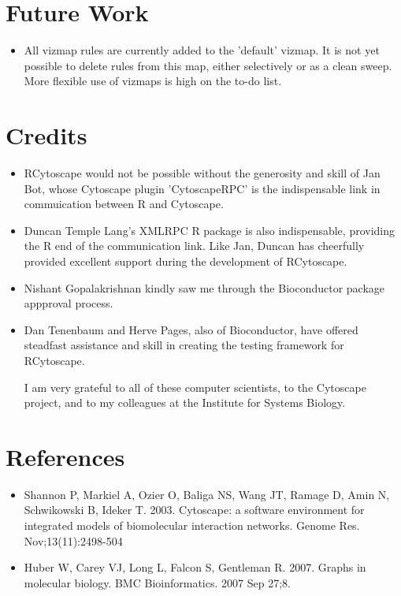 \documentclass[12pt]{article}
\begin{document}
\section{Future Work}

\begin{itemize}

\item All vizmap rules are currently added to the 'default' vizmap.  It is not yet possible to delete rules from this map, either selectively or as a clean sweep.  More flexible use of vizmaps is high on the to-do list.

\end{itemize}

\section{Credits}



\begin{itemize}

\item RCytoscape would not be possible without the generosity and skill of Jan Bot, whose Cytoscape plugin 'CytoscapeRPC' is the indispensable link in commuication between R and Cytoscape.

\item Duncan Temple Lang's XMLRPC R package is also indispensable, providing the R end of the communication link.  Like Jan, Duncan has cheerfully provided excellent support during the development of RCytoscape.

\item Nishant Gopalakrishnan kindly saw me through the Bioconductor package appproval process.  

\item Dan Tenenbaum and Herve Pages, also of Bioconductor, have offered steadfast assistance and skill in creating the testing framework for RCytoscape.


I am very grateful to all of these computer scientists, to the Cytoscape project, and to my colleagues at the Institute for Systems Biology.

\end{itemize}


\section{References}

\begin{itemize}

\item Shannon P, Markiel A, Ozier O, Baliga NS, Wang JT, Ramage D, Amin N, Schwikowski B, Ideker T. 2003. Cytoscape: a software environment for integrated models of biomolecular interaction networks. Genome Res. Nov;13(11):2498-504

\item Huber W, Carey VJ, Long L, Falcon S, Gentleman R. 2007. Graphs in molecular biology. BMC Bioinformatics. 2007 Sep 27;8.

\end{itemize}
\end{document}
